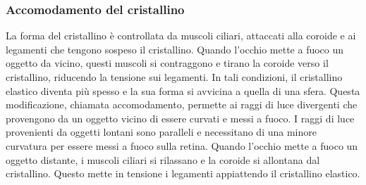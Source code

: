 \documentclass[a4paper]{article}
\begin{document}







\subsubsection{Accomodamento del cristallino}
La forma del cristallino è controllata da muscoli ciliari, attaccati alla coroide e ai legamenti
che tengono sospeso il cristallino. Quando l'occhio mette a fuoco un oggetto da vicino,
questi muscoli si contraggono e tirano la coroide verso il cristallino, riducendo la tensione
sui legamenti. In tali condizioni, il cristallino elastico diventa più spesso e la sua forma si
avvicina a quella di una sfera. Questa modificazione, chiamata accomodamento, permette
ai raggi di luce divergenti che provengono da un oggetto vicino di essere curvati e messi a
fuoco. I raggi di luce provenienti da oggetti lontani sono paralleli e necessitano di una minore
curvatura per essere messi a fuoco sulla retina. Quando l'occhio mette a fuoco un oggetto
distante, i muscoli ciliari si rilassano e la coroide si allontana dal cristallino. Questo mette in
tensione i legamenti appiattendo il cristallino elastico.
\end{document}

